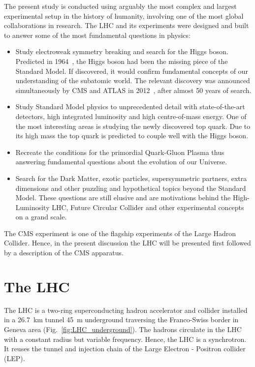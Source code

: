\label{sec:experimental_setup}

The present study is conducted using arguably the most complex and largest experimental setup in the history of humanity, involving one of the most global collaborations in research. The LHC and its experiments were designed and built to answer some of the most fundamental questions in physics:

\begin{itemize}
\item Study electroweak symmetry breaking and search for the Higgs boson. Predicted in 1964~\cite{Higgs:1964ia}, \cite{Englert:1964et} the Higgs boson had been the missing piece of the Standard Model. If discovered, it would confirm fundamental concepts of our understanding of the subatomic world. The relevant discovery was announced simultaneously by CMS and ATLAS in 2012~\cite{Chatrchyan:2012xdj}, \cite{Aad:2012tfa} after almost 50 years of search.
\item Study Standard Model physics to unprecedented detail with state-of-the-art detectors, high integrated luminosity and high centre-of-mass energy. One of the most interesting areas is studying the newly discovered top quark. Due to its high mass the top quark is predicted to couple well with the Higgs boson.
\item Recreate the conditions for the primordial Quark-Gluon Plasma thus answering fundamental questions about the evolution of our Universe.
\item Search for the Dark Matter, exotic particles, supersymmetric partners, extra dimensions and other puzzling and hypothetical topics beyond the Standard Model. These questions are still elusive and are motivations behind the High-Luminosity LHC, Future Circular Collider and other experimental concepts on a grand scale.
\end {itemize}

The CMS experiment is one of the flagship experiments of the Large Hadron Collider. Hence, in the present discussion the LHC will be presented first followed by a description of the CMS apparatus.

\section{The LHC}

The LHC is a two-ring superconducting hadron accelerator and collider installed in a 26.7~km tunnel 45~m underground traversing the Franco-Swiss border in Geneva area (Fig.~\ref{fig:LHC_underground}). The hadrons circulate in the LHC with a constant radius but variable frequency. Hence, the LHC is a synchrotron. It reuses the tunnel and injection chain of the Large Electron - Positron collider (LEP).

